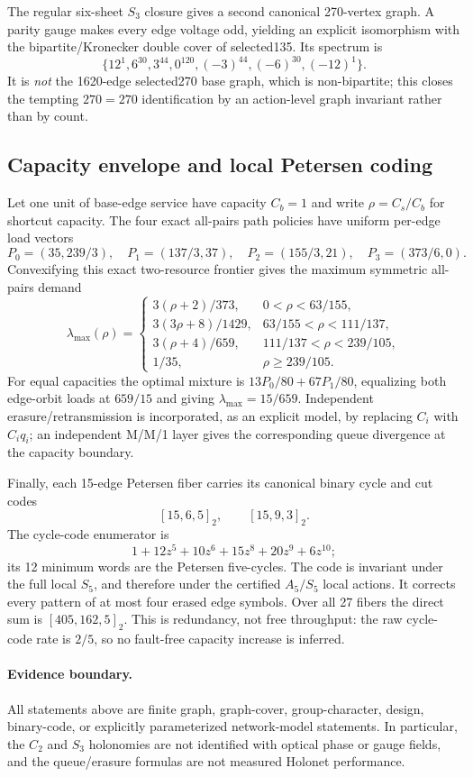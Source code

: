 The regular six-sheet $S_3$ closure gives a second canonical 270-vertex graph.
A parity gauge makes every edge voltage odd, yielding an explicit isomorphism
with the bipartite/Kronecker double cover of selected135.  Its spectrum is
\[
 \{12^1,6^{30},3^{44},0^{120},(-3)^{44},(-6)^{30},(-12)^1\}.
\]
It is \emph{not} the 1620-edge selected270 base graph, which is non-bipartite;
this closes the tempting $270=270$ identification by an action-level graph
invariant rather than by count.

\subsection{Capacity envelope and local Petersen coding}

Let one unit of base-edge service have capacity $C_b=1$ and write
$\rho=C_s/C_b$ for shortcut capacity.  The four exact all-pairs path policies
have uniform per-edge load vectors
\[
 P_0=(35,239/3),\quad P_1=(137/3,37),\quad
 P_2=(155/3,21),\quad P_3=(373/6,0).
\]
Convexifying this exact two-resource frontier gives the maximum symmetric
all-pairs demand
\[
\lambda_{\max}(\rho)=
\begin{cases}
3(\rho+2)/373,&0<\rho<63/155,\\
3(3\rho+8)/1429,&63/155<\rho<111/137,\\
3(\rho+4)/659,&111/137<\rho<239/105,\\
1/35,&\rho\ge239/105.
\end{cases}
\]
For equal capacities the optimal mixture is $13P_0/80+67P_1/80$, equalizing
both edge-orbit loads at $659/15$ and giving $\lambda_{\max}=15/659$.
Independent erasure/retransmission is incorporated, as an explicit model, by
replacing $C_i$ with $C_iq_i$; an independent M/M/1 layer gives the corresponding
queue divergence at the capacity boundary.

Finally, each 15-edge Petersen fiber carries its canonical binary cycle and cut
codes
\[
 [15,6,5]_2,\qquad [15,9,3]_2.
\]
The cycle-code enumerator is
\[
 1+12z^5+10z^6+15z^8+20z^9+6z^{10};
\]
its 12 minimum words are the Petersen five-cycles.  The code is invariant under
the full local $S_5$, and therefore under the certified $A_5/S_5$ local actions.
It corrects every pattern of at most four erased edge symbols.  Over all 27
fibers the direct sum is $[405,162,5]_2$.  This is redundancy, not free
throughput: the raw cycle-code rate is $2/5$, so no fault-free capacity increase
is inferred.

\paragraph{Evidence boundary.}
All statements above are finite graph, graph-cover, group-character, design,
binary-code, or explicitly parameterized network-model statements.  In
particular, the $C_2$ and $S_3$ holonomies are not identified with optical phase
or gauge fields, and the queue/erasure formulas are not measured Holonet
performance.
